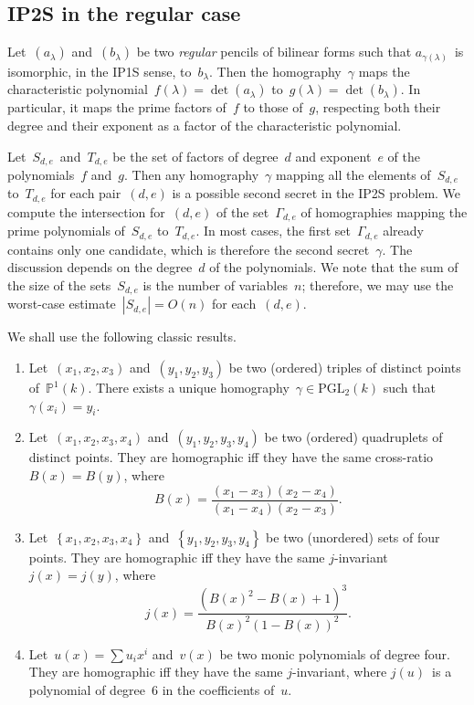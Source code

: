 \documentclass{lms}%
\def\acco#1{\left\{#1\right\}}
\def\abs#1{\left|#1\right|}
\def\card#1{\abs{#1}}
\begin{document}
\subsection{IP2S in the regular case}

Let~$(a_{λ})$ and~$(b_{λ})$ be two \emph{regular} pencils of bilinear
forms such that $a_{γ(λ)}$~is isomorphic, in the IP1S sense, to~$b_{λ}$.
Then the homography~$γ$ maps the characteristic polynomial~$f(λ)
= \det (a_{λ})$ to~$g(λ) = \det (b_{λ})$. In particular, it maps the
prime factors of~$f$ to those of~$g$, respecting both their degree and
their exponent as a factor of the characteristic polynomial.

Let~$S_{d,e}$~and~$T_{d,e}$ be the set of factors of degree~$d$ and
exponent~$e$ of the polynomials~$f$ and~$g$. Then any homography~$γ$
mapping all the elements of~$S_{d,e}$ to~$T_{d,e}$ for each pair~$(d,e)$
is a possible second secret in the IP2S problem. We compute the
intersection for~$(d,e)$ of the set~$Γ_{d,e}$ of homographies mapping the
prime polynomials of~$S_{d,e}$ to~$T_{d,e}$. In most cases, the first
set~$Γ_{d,e}$ already contains only one candidate, which is therefore the
second secret~$γ$. The discussion depends on the degree~$d$ of the
polynomials. We note that the sum of the size of the sets~$S_{d,e}$ is
the number of variables~$n$; therefore, we may use the worst-case
estimate~$\card{S_{d,e}} = O(n)$ for each~$(d,e)$.

We shall use the following classic results.
\begin{prop}\label{prop:homography}
\begin{enumerate}
\item Let~$(x_1, x_2, x_3)$ and~$(y_1, y_2, y_3)$ be two (ordered)
triples of distinct points of~$ℙ^1(k)$. There exists a unique
homography~$γ ∈ \mathrm{PGL}_2(k)$ such that~$γ(x_i) = y_i$.
\item Let~$(x_1, x_2, x_3, x_4)$ and~$(y_1, y_2, y_3, y_4)$ be two
(ordered) quadruplets of distinct points. They are homographic iff they
have the same cross-ratio~$B(x) = B(y)$, where
\begin{equation}
B(x) = \frac{(x_1-x_3)(x_2-x_4)}{(x_1-x_4)(x_2-x_3)}.
\end{equation}
\item Let~$\acco{x_1, x_2, x_3, x_4}$ and~$\acco{y_1, y_2, y_3, y_4}$ be
two (unordered) sets of four points. They are homographic iff they have
the same $j$-invariant~$j(x) = j(y)$, where
\begin{equation}\label{eq:j-invariant}
j(x) = \frac{(B(x)^2-B(x)+1)^3}{B(x)^2(1-B(x))^2}.
\end{equation}
\item Let~$u(x) = ∑ u_i x^i$ and~$v(x)$ be two monic polynomials
of degree four. They are homographic iff they have the same $j$-invariant,
where $j(u)$~is a polynomial of degree~$6$ in the coefficients of~$u$.
\end{enumerate}
\end{prop}
\end{document}
